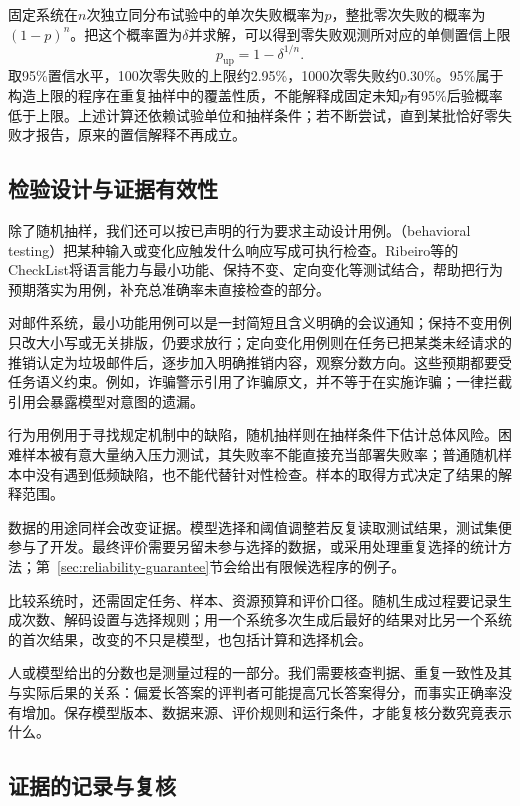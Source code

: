 \begin{example}[零次失败的含义]
\label{ex:trust-zero-failures}
固定系统在$n$次独立同分布试验中的单次失败概率为$p$，整批零次失败的概率为$(1-p)^n$。把这个概率置为$\delta$并求解，可以得到零失败观测所对应的单侧置信上限
\[
 p_{\mathrm{up}}=1-\delta^{1/n}.
\]
取95\%置信水平，100次零失败的上限约2.95\%，1000次零失败约0.30\%。95\%属于构造上限的程序在重复抽样中的覆盖性质，不能解释成固定未知$p$有95\%后验概率低于上限。上述计算还依赖试验单位和抽样条件；若不断尝试，直到某批恰好零失败才报告，原来的置信解释不再成立。
\end{example}

\subsection{检验设计与证据有效性}

除了随机抽样，我们还可以按已声明的行为要求主动设计用例。（behavioral testing）把某种输入或变化应触发什么响应写成可执行检查。Ribeiro等的CheckList将语言能力与最小功能、保持不变、定向变化等测试结合，帮助把行为预期落实为用例，补充总准确率未直接检查的部分。

对邮件系统，最小功能用例可以是一封简短且含义明确的会议通知；保持不变用例只改大小写或无关排版，仍要求放行；定向变化用例则在任务已把某类未经请求的推销认定为垃圾邮件后，逐步加入明确推销内容，观察分数方向。这些预期都要受任务语义约束。例如，诈骗警示引用了诈骗原文，并不等于在实施诈骗；一律拦截引用会暴露模型对意图的遗漏。

行为用例用于寻找规定机制中的缺陷，随机抽样则在抽样条件下估计总体风险。困难样本被有意大量纳入压力测试，其失败率不能直接充当部署失败率；普通随机样本中没有遇到低频缺陷，也不能代替针对性检查。样本的取得方式决定了结果的解释范围。

数据的用途同样会改变证据。模型选择和阈值调整若反复读取测试结果，测试集便参与了开发。最终评价需要另留未参与选择的数据，或采用处理重复选择的统计方法；第~\ref{sec:reliability-guarantee}节会给出有限候选程序的例子。

比较系统时，还需固定任务、样本、资源预算和评价口径。随机生成过程要记录生成次数、解码设置与选择规则；用一个系统多次生成后最好的结果对比另一个系统的首次结果，改变的不只是模型，也包括计算和选择机会。

人或模型给出的分数也是测量过程的一部分。我们需要核查判据、重复一致性及其与实际后果的关系：偏爱长答案的评判者可能提高冗长答案得分，而事实正确率没有增加。保存模型版本、数据来源、评价规则和运行条件，才能复核分数究竟表示什么。

\subsection{证据的记录与复核}


